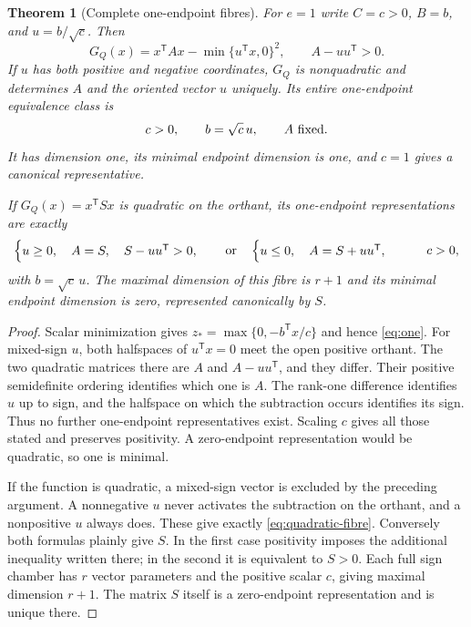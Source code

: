 \documentclass[11pt,reqno]{amsart}
\numberwithin{equation}{section}
\newtheorem{theorem}{Theorem}[section]
\theoremstyle{definition}
\theoremstyle{remark}
\begin{document}
\begin{theorem}[Complete one-endpoint fibres]\label{thm:one-endpoint}
For $e=1$ write $C=c>0$, $B=b$, and $u=b/\sqrt c$. Then
\begin{equation}\label{eq:one}
 G_Q(x)=x^{\mathsf T}Ax-\min\{u^{\mathsf T}x,0\}^2,
 \qquad A-uu^{\mathsf T}>0.
\end{equation}
If $u$ has both positive and negative coordinates, $G_Q$ is nonquadratic and determines $A$ and the oriented vector $u$ uniquely. Its entire one-endpoint equivalence class is
\[
 c>0,\qquad b=\sqrt c\,u,\qquad A\ \hbox{fixed}.
\]
It has dimension one, its minimal endpoint dimension is one, and $c=1$ gives a canonical representative.

If $G_Q(x)=x^{\mathsf T}Sx$ is quadratic on the orthant, its one-endpoint representations are exactly
\begin{equation}\label{eq:quadratic-fibre}
 \begin{cases}u\ge0,\quad A=S,\quad S-uu^{\mathsf T}>0,\end{cases}
 \quad\hbox{or}\quad
 \begin{cases}u\le0,\quad A=S+uu^{\mathsf T},\end{cases}
 \qquad c>0,
\end{equation}
with $b=\sqrt c\,u$. The maximal dimension of this fibre is $r+1$ and its minimal endpoint dimension is zero, represented canonically by $S$.
\end{theorem}
\begin{proof}
Scalar minimization gives $z_* =\max\{0,-b^{\mathsf T}x/c\}$ and hence \eqref{eq:one}. For mixed-sign $u$, both halfspaces of $u^{\mathsf T}x=0$ meet the open positive orthant. The two quadratic matrices there are $A$ and $A-uu^{\mathsf T}$, and they differ. Their positive semidefinite ordering identifies which one is $A$. The rank-one difference identifies $u$ up to sign, and the halfspace on which the subtraction occurs identifies its sign. Thus no further one-endpoint representatives exist. Scaling $c$ gives all those stated and preserves positivity. A zero-endpoint representation would be quadratic, so one is minimal.

If the function is quadratic, a mixed-sign vector is excluded by the preceding argument. A nonnegative $u$ never activates the subtraction on the orthant, and a nonpositive $u$ always does. These give exactly \eqref{eq:quadratic-fibre}. Conversely both formulas plainly give $S$. In the first case positivity imposes the additional inequality written there; in the second it is equivalent to $S>0$. Each full sign chamber has $r$ vector parameters and the positive scalar $c$, giving maximal dimension $r+1$. The matrix $S$ itself is a zero-endpoint representation and is unique there.
\end{proof}
\end{document}
